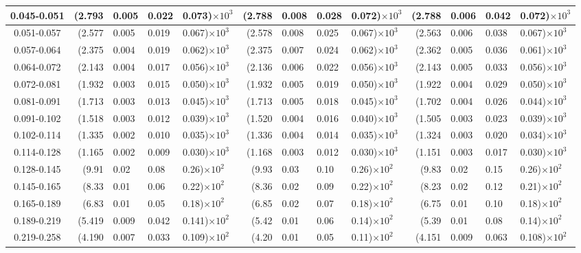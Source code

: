 \begin{table}[!htbp]
{\begin{tabular}{ | c | r@{$\pm$}l@{$\pm$}l@{$\pm$}l | r@{$\pm$}l@{$\pm$}l@{$\pm$}l | r@{$\pm$}l@{$\pm$}l@{$\pm$}l |}
0.045-0.051 & (2.793&0.005&0.022&0.073)$\times 10^{3}$ & (2.788&0.008&0.028&0.072)$\times 10^{3}$ & (2.788&0.006&0.042&0.072)$\times 10^{3}$ \\ \hline
0.051-0.057 & (2.577&0.005&0.019&0.067)$\times 10^{3}$ & (2.578&0.008&0.025&0.067)$\times 10^{3}$ & (2.563&0.006&0.038&0.067)$\times 10^{3}$ \\ \hline
0.057-0.064 & (2.375&0.004&0.019&0.062)$\times 10^{3}$ & (2.375&0.007&0.024&0.062)$\times 10^{3}$ & (2.362&0.005&0.036&0.061)$\times 10^{3}$ \\ \hline
0.064-0.072 & (2.143&0.004&0.017&0.056)$\times 10^{3}$ & (2.136&0.006&0.022&0.056)$\times 10^{3}$ & (2.143&0.005&0.033&0.056)$\times 10^{3}$ \\ \hline
0.072-0.081 & (1.932&0.003&0.015&0.050)$\times 10^{3}$ & (1.932&0.005&0.019&0.050)$\times 10^{3}$ & (1.922&0.004&0.029&0.050)$\times 10^{3}$ \\ \hline
0.081-0.091 & (1.713&0.003&0.013&0.045)$\times 10^{3}$ & (1.713&0.005&0.018&0.045)$\times 10^{3}$ & (1.702&0.004&0.026&0.044)$\times 10^{3}$ \\ \hline
0.091-0.102 & (1.518&0.003&0.012&0.039)$\times 10^{3}$ & (1.520&0.004&0.016&0.040)$\times 10^{3}$ & (1.505&0.003&0.023&0.039)$\times 10^{3}$ \\ \hline
0.102-0.114 & (1.335&0.002&0.010&0.035)$\times 10^{3}$ & (1.336&0.004&0.014&0.035)$\times 10^{3}$ & (1.324&0.003&0.020&0.034)$\times 10^{3}$ \\ \hline
0.114-0.128 & (1.165&0.002&0.009&0.030)$\times 10^{3}$ & (1.168&0.003&0.012&0.030)$\times 10^{3}$ & (1.151&0.003&0.017&0.030)$\times 10^{3}$ \\ \hline
0.128-0.145 & (9.91&0.02&0.08&0.26)$\times 10^{2}$ & (9.93&0.03&0.10&0.26)$\times 10^{2}$ & (9.83&0.02&0.15&0.26)$\times 10^{2}$ \\ \hline
0.145-0.165 & (8.33&0.01&0.06&0.22)$\times 10^{2}$ & (8.36&0.02&0.09&0.22)$\times 10^{2}$ & (8.23&0.02&0.12&0.21)$\times 10^{2}$ \\ \hline
0.165-0.189 & (6.83&0.01&0.05&0.18)$\times 10^{2}$ & (6.85&0.02&0.07&0.18)$\times 10^{2}$ & (6.75&0.01&0.10&0.18)$\times 10^{2}$ \\ \hline
0.189-0.219 & (5.419&0.009&0.042&0.141)$\times 10^{2}$ & (5.42&0.01&0.06&0.14)$\times 10^{2}$ & (5.39&0.01&0.08&0.14)$\times 10^{2}$ \\ \hline
0.219-0.258 & (4.190&0.007&0.033&0.109)$\times 10^{2}$ & (4.20&0.01&0.05&0.11)$\times 10^{2}$ & (4.151&0.009&0.063&0.108)$\times 10^{2}$ \\ \hline

\end{tabular}}
\end{table}
